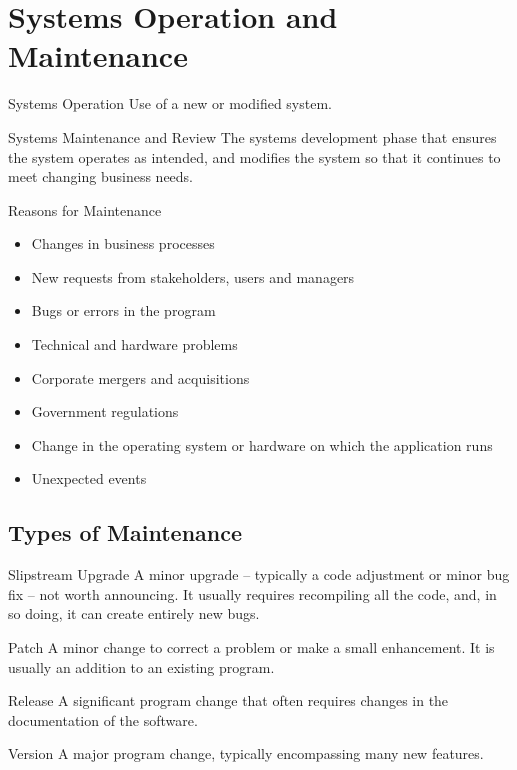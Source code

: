 \documentclass[\main/notes.tex]{subfiles}
\begin{document}
		\section{Systems Operation and Maintenance}
			\begin{definition}{Systems Operation}
				Use of a new or modified system.
			\end{definition}
			\begin{definition}{Systems Maintenance and Review}
				The systems development phase that ensures the system operates as intended, and modifies the system so that it continues to meet changing business needs.
			\end{definition}
			\begin{sidenote}{Reasons for Maintenance}
				\begin{multicols}{2}
					\begin{itemize}[nosep]
						\item Changes in business processes
						\item New requests from stakeholders, users and managers
						\item Bugs or errors in the program
						\item Technical and hardware problems
						\item Corporate mergers and acquisitions
						\item Government regulations
						\item Change in the operating system or hardware on which the application runs
						\item Unexpected events
					\end{itemize}
				\end{multicols}
			\end{sidenote}
			\subsection{Types of Maintenance}
				\begin{definition}{Slipstream Upgrade}
					A minor upgrade -- typically a code adjustment or minor bug fix -- not worth announcing. It usually requires recompiling all the code, and, in so doing, it can create entirely new bugs.
				\end{definition}
				\begin{definition}{Patch}
					A minor change to correct a problem or make a small enhancement. It is usually an addition to an existing program.
				\end{definition}
				\begin{definition}{Release}
					A significant program change that often requires changes in the documentation of the software.
				\end{definition}
				\begin{definition}{Version}
					A major program change, typically encompassing many new features.
				\end{definition}
\end{document}
